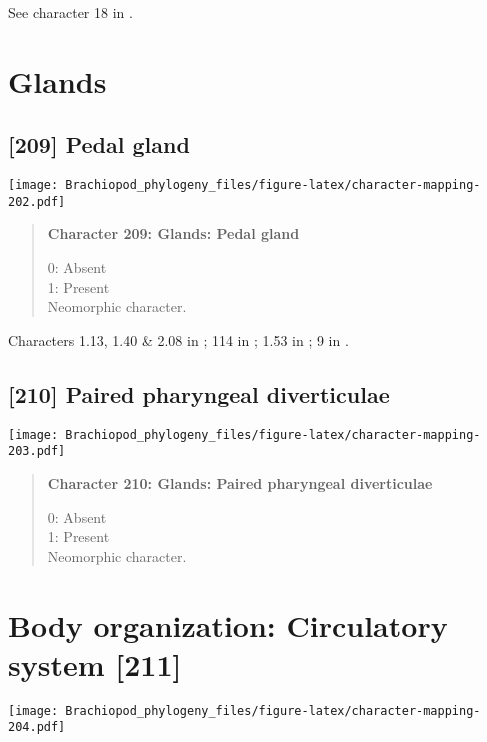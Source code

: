 \documentclass[openany]{book}
\theoremstyle{definition}
\theoremstyle{definition}
\theoremstyle{definition}
\theoremstyle{remark}
\begin{document}
See character 18 in \citet{Haszprunar1996}.

\section{Glands}\label{glands-1}

\subsection*{{[}209{]} Pedal gland}\label{pedal-gland-1}

\texttt{[image: Brachiopod\_phylogeny\_files/figure-latex/character-mapping-202.pdf]}

\begin{quote}
\textbf{Character 209: Glands: Pedal gland}

0: Absent\\
1: Present\\
Neomorphic character.
\end{quote}

Characters 1.13, 1.40 \& 2.08 in \citet{Scheltema1993}; 114 in
\citet{Giribet2002}; 1.53 in \citet{SPS1996}; 9 in
\citet{Haszprunar1996}.

\subsection*{{[}210{]} Paired pharyngeal
diverticulae}\label{paired-pharyngeal-diverticulae}

\texttt{[image: Brachiopod\_phylogeny\_files/figure-latex/character-mapping-203.pdf]}

\begin{quote}
\textbf{Character 210: Glands: Paired pharyngeal diverticulae}

0: Absent\\
1: Present\\
Neomorphic character.
\end{quote}

\section{Body organization: Circulatory system
{[}211{]}}\label{body-organization-circulatory-system-211}

\texttt{[image: Brachiopod\_phylogeny\_files/figure-latex/character-mapping-204.pdf]}
\end{document}
